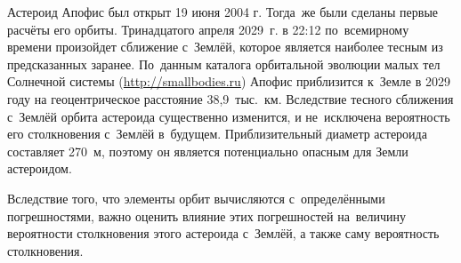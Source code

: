 



\date{10/IV/2012} %



\maketitle

\small
Астероид Апофис был открыт 19 июня 2004 г. Тогда~же были сделаны первые расчёты его орбиты. 
Тринадцатого апреля 2029~г. в 22:12 по~всемирному времени произойдет сближение с~Землёй, 
которое является наиболее тесным из предсказанных заранее. 
По~данным каталога орбитальной эволюции малых тел Солнечной системы (\mbox{\url{http://smallbodies.ru}}) Апофис  приблизится к~Земле в 2029 году на геоцентрическое расстояние 38,9~тыс.~км. 
Вследствие тесного сближения с~Землёй  орбита астероида существенно изменится, и не~исключена вероятность его столкновения с~Землёй в~будущем. 
Приблизительный диаметр астероида составляет 270~м, поэтому он является потенциально опасным для Земли астероидом.

Вследствие того, что элементы орбит вычисляются с~определёнными погрешностями, важно оценить влияние этих погрешностей на~величину вероятности столкновения этого астероида с~Землёй, а также саму вероятность столкновения. 

